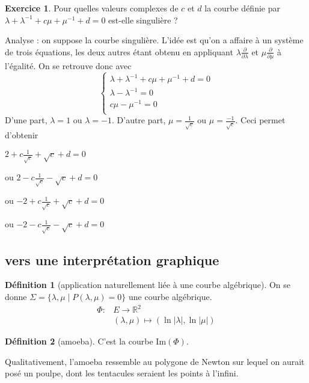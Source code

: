 \documentclass{article}
\newcommand{\R}{\mathbb{R}} %
\theoremstyle{definition} %
\newtheorem{defi}{Définition}
\newtheorem{exo}{Exercice}
\newcommand{\derp}[2]{\frac{\partial {#1}}{\partial {#2}}}
\newcommand{\1}{\mathbb{1}} %
\begin{document}
\begin{exo}
Pour quelles valeurs complexes de $c$ et $d$ la courbe définie par $\lambda + \lambda^{-1} + c \mu + \mu^{-1} + d =0$ est-elle singulière ?
\end{exo}

Analyse : on suppose la courbe singulière.
L'idée est qu'on a affaire à un système de trois équations, les deux autres étant obtenu en appliquant $\lambda \derp{}{\lambda}$ et $\mu \derp{}{\mu}$ à l'égalité.
On se retrouve donc avec 
$$\begin{cases}
    \lambda + \lambda^{-1} + c \mu + \mu^{-1} + d =0\\
    \lambda - \lambda^{-1} =0 \\
    c \mu - \mu^{-1}=0\\
\end{cases}$$
 D'une part, $\lambda=1$ ou $\lambda=-1$.
 D'autre part, $\mu=\frac{1}{\sqrt{c}}$ ou $\mu=\frac{-1}{\sqrt{c}}$.
 Ceci permet d'obtenir

  $2 + c \frac{1}{\sqrt{c}} + \sqrt{c} + d=0$

 ou $2 - c \frac{1}{\sqrt{c}} - \sqrt{c} + d=0$
 
 ou $-2 + c \frac{1}{\sqrt{c}} + \sqrt{c} + d=0$
 
 ou $-2 - c \frac{1}{\sqrt{c}} - \sqrt{c} + d=0$

\subsection{vers une interprétation graphique}

\begin{defi}[application naturellement liée à une courbe algébrique]
On se donne $\Sigma=\{ \lambda ,\mu \mid P(\lambda,\mu)=0 \}$ une courbe algébrique.
\begin{align*}
\Phi : & E \to \R^2 \\
& (\lambda,\mu) \mapsto (\ln |\lambda|,\ln |\mu|)
\end{align*}

\end{defi}

\begin{defi}[amoeba]
C'est la courbe $\mathrm{Im} (\Phi)$.

\end{defi}

Qualitativement, l'amoeba ressemble au polygone de Newton sur lequel on aurait posé un poulpe, dont les tentacules seraient les points à l'infini.
\end{document}
